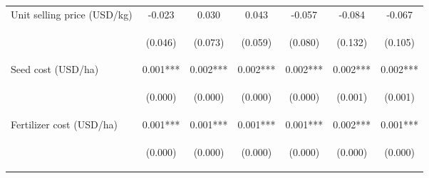 \begin{center}
\begin{tabular}{lcccccc}
Unit selling price (USD/kg) & -0.023 & 0.030 & 0.043 & -0.057 & -0.084 & -0.067 \\
\vspace{4pt} & \begin{footnotesize}(0.046)\end{footnotesize} & \begin{footnotesize}(0.073)\end{footnotesize} & \begin{footnotesize}(0.059)\end{footnotesize} & \begin{footnotesize}(0.080)\end{footnotesize} & \begin{footnotesize}(0.132)\end{footnotesize} & \begin{footnotesize}(0.105)\end{footnotesize} \\
Seed cost (USD/ha) & 0.001*** & 0.002*** & 0.002*** & 0.002*** & 0.002*** & 0.002*** \\
\vspace{4pt} & \begin{footnotesize}(0.000)\end{footnotesize} & \begin{footnotesize}(0.000)\end{footnotesize} & \begin{footnotesize}(0.000)\end{footnotesize} & \begin{footnotesize}(0.000)\end{footnotesize} & \begin{footnotesize}(0.001)\end{footnotesize} & \begin{footnotesize}(0.001)\end{footnotesize} \\
Fertilizer cost (USD/ha) & 0.001*** & 0.001*** & 0.001*** & 0.001*** & 0.002*** & 0.001*** \\
\vspace{4pt} & \begin{footnotesize}(0.000)\end{footnotesize} & \begin{footnotesize}(0.000)\end{footnotesize} & \begin{footnotesize}(0.000)\end{footnotesize} & \begin{footnotesize}(0.000)\end{footnotesize} & \begin{footnotesize}(0.000)\end{footnotesize} & \begin{footnotesize}(0.000)\end{footnotesize} \\

\end{tabular}
\end{center}
